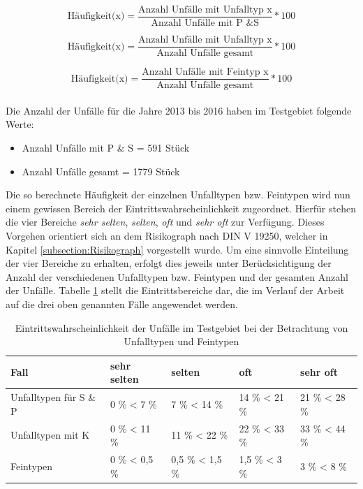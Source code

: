 \begin{equation}\label{equation:Häufigkeit(1)}
\text{Häufigkeit(x)} = \dfrac{\text{Anzahl Unfälle mit Unfalltyp x}}{\text{Anzahl Unfälle mit P \& S}}*100
\end{equation}

\begin{equation}\label{equation:Häufigkeit(2)}
\text{Häufigkeit(x)} = \dfrac{\text{Anzahl Unfälle mit Unfalltyp x}}{\text{Anzahl Unfälle gesamt}}*100
\end{equation}

\begin{equation}\label{equation:Häufigkeit(3)}
\text{Häufigkeit(x)} = \dfrac{\text{Anzahl Unfälle mit Feintyp x}}{\text{Anzahl Unfälle gesamt}}*100
\end{equation}\\

Die Anzahl der Unfälle für die Jahre 2013 bis 2016 haben im Testgebiet folgende Werte:

\begin{itemize}
	\item Anzahl Unfälle mit P \& S = 591 Stück
	\item Anzahl Unfälle gesamt = 1779 Stück
\end{itemize}

Die so berechnete Häufigkeit der einzelnen Unfalltypen bzw. Feintypen wird nun einem gewissen Bereich der Eintrittswahrscheinlichkeit zugeordnet. Hierfür stehen die vier Bereiche \textit{sehr selten}, \textit{selten}, \textit{oft} und \textit{sehr oft} zur Verfügung. Dieses Vorgehen orientiert sich an dem Risikograph nach DIN V 19250, welcher in Kapitel \ref{subsection:Risikograph} vorgestellt wurde. Um eine sinnvolle Einteilung der  vier Bereiche zu erhalten, erfolgt dies jeweils unter Berücksichtigung der Anzahl der verschiedenen Unfalltypen bzw. Feintypen und der gesamten Anzahl der Unfälle. Tabelle \ref{tab:Haeufigkeits Bereiche} stellt die Eintrittsbereiche dar, die im Verlauf der Arbeit auf die drei oben genannten Fälle angewendet werden.

\begin{table}[htpb]
	\scriptsize
	\caption[Eintrittswahrscheinlichkeit der Unfälle im Testgebiet bei der Betrachtung von Unfalltypen und Feintypen]{Eintrittswahrscheinlichkeit der Unfälle im Testgebiet bei der Betrachtung von Unfalltypen und Feintypen}\label{tab:Haeufigkeits Bereiche}
	\centering
		\begin{tabular}{p{2cm} l l l l}
			\toprule
			Fall & sehr selten & selten & oft & sehr oft \\
			\midrule
			Unfalltypen für S \& P & 0 \% < 7 \%  & 7 \% < 14 \% & 14 \% < 21 \% & 21 \% < 28 \%\\
			Unfalltypen mit K & 0 \% < 11 \%  & 11 \% < 22 \% & 22 \% < 33 \% & 33 \% < 44 \%\\
			Feintypen & 0 \% < 0,5 \% & 0,5 \% < 1,5 \% & 1,5 \% < 3 \% & 3 \% < 8 \%\\
			\bottomrule
		\end{tabular}
\end{table}

